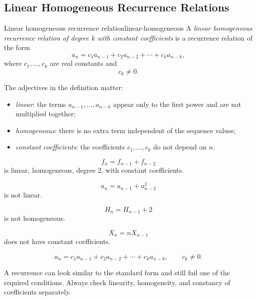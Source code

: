 \subsection{Linear Homogeneous Recurrence Relations}

\begin{definition}{Linear homogeneous recurrence relation}{linear-homogeneous}
A \emph{linear homogeneous recurrence relation of degree $k$ with constant coefficients} is a recurrence relation of the form
\[
a_n=c_1a_{n-1}+c_2a_{n-2}+\cdots+c_ka_{n-k},
\]
where $c_1,\dots,c_k$ are real constants and
\[
c_k\neq 0.
\]
\end{definition}

The adjectives in the definition matter:
\begin{itemize}[leftmargin=*]
    \item \emph{linear}: the terms $a_{n-1},\dots,a_{n-k}$ appear only to the first power and are not multiplied together;
    \item \emph{homogeneous}: there is no extra term independent of the sequence values;
    \item \emph{constant coefficients}: the coefficients $c_1,\dots,c_k$ do not depend on $n$.
\end{itemize}

\begin{examplebox}[title={Examples and non-examples}]
\[
f_n=f_{n-1}+f_{n-2}
\]
is linear, homogeneous, degree $2$, with constant coefficients.

\[
a_n=a_{n-1}+a_{n-2}^2
\]
is not linear.

\[
H_n=H_{n-1}+2
\]
is not homogeneous.

\[
X_n=nX_{n-1}
\]
does not have constant coefficients.
\end{examplebox}

\begin{keyformula}[title={General form}]
\[
a_n=c_1a_{n-1}+c_2a_{n-2}+\cdots+c_ka_{n-k},
\qquad c_k\neq 0.
\]
\end{keyformula}

\begin{commonmistake}[title={Checking only the shape of the left-hand side}]
A recurrence can look similar to the standard form and still fail one of the required conditions. Always check linearity, homogeneity, and constancy of coefficients separately.
\end{commonmistake}


